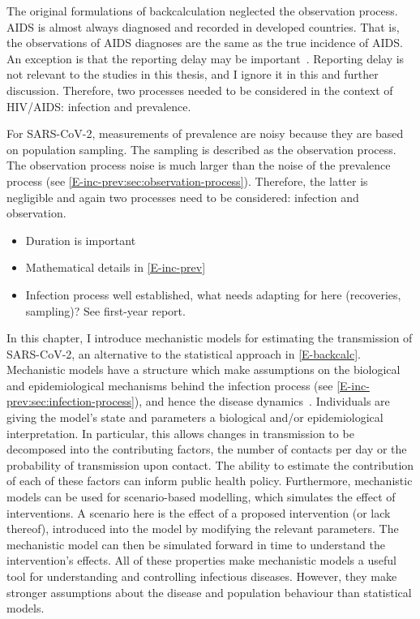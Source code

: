 \documentclass[thesis.tex]{subfiles}
\begin{document}
The original formulations of backcalculation neglected the observation process.
AIDS is almost always diagnosed and recorded in developed countries.
That is, the observations of AIDS diagnoses are the same as the true incidence of AIDS.
An exception is that the reporting delay may be important~\autocite{paganoHIV}.
Reporting delay is not relevant to the studies in this thesis, and I ignore it in this and further discussion.
Therefore, two processes needed to be considered in the context of HIV/AIDS: infection and prevalence.

For SARS-CoV-2, measurements of prevalence are noisy because they are based on population sampling.
The sampling is described as the observation process.
The observation process noise is much larger than the noise of the prevalence process (see \cref{E-inc-prev:sec:observation-process}).
Therefore, the latter is negligible and again two processes need to be considered: infection and observation.

\begin{itemize}
    \item Duration is important
    \item Mathematical details in \cref{E-inc-prev}
    \item Infection process well established, what needs adapting for here (recoveries, sampling)? See first-year report.
\end{itemize}

In this chapter, I introduce mechanistic models for estimating the transmission of SARS-CoV-2, an alternative to the statistical approach in \cref{E-backcalc}.
Mechanistic models have a structure which make assumptions on the biological and epidemiological mechanisms behind the infection process (see \cref{E-inc-prev:sec:infection-process}), and hence the disease dynamics~\autocite{lesslerMechanistic}.
Individuals are giving the model's state and parameters a biological and/or epidemiological interpretation.
In particular, this allows changes in transmission to be decomposed into the contributing factors, \eg the number of contacts per day or the probability of transmission upon contact.
The ability to estimate the contribution of each of these factors can inform public health policy.
Furthermore, mechanistic models can be used for scenario-based modelling, which simulates the effect of interventions.
A scenario here is the effect of a proposed intervention (or lack thereof), introduced into the model by modifying the relevant parameters.
The mechanistic model can then be simulated forward in time to understand the intervention's effects.
All of these properties make mechanistic models a useful tool for understanding and controlling infectious diseases.
However, they make stronger assumptions about the disease and population behaviour than statistical models.
\end{document}
